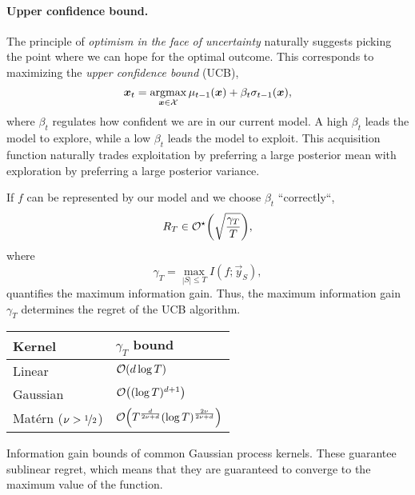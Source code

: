 \paragraph{Upper confidence bound.}

The principle of \textit{optimism in the face of uncertainty} naturally
suggests picking the point where we can hope for the optimal outcome. This
corresponds to maximizing the \textit{upper confidence bound}
(UCB), \[
    \bm{x}_t = \operatorname*{argmax}_{\bm{x}\in\mathcal{X}} \mu_{t-1}(\bm{x}) + \beta_t \sigma_{t-1}(\bm{x}),
\]
where $\beta_t$ regulates how confident we are in our current model. A high
$\beta_t$ leads the model to explore, while a low $\beta_t$ leads the model
to exploit. This acquisition function naturally trades exploitation by
preferring a large posterior mean with exploration by preferring a large
posterior variance.

If $f$ can be represented by our model and we choose $\beta_t$ ``correctly``, \[
    R_T \in \mathcal{O}^\star \lft( \sqrt{\frac{\gamma_T}{T}} \rgt),
\]
where \[
    \gamma_T = \max_{|S|\leq T} I(f;\vec{y}_S),
\]
quantifies the maximum information gain. Thus, the maximum information gain
$\gamma_T$ determines the regret of the UCB algorithm.

\begin{margintable}
    \centering
    \begin{tabular}{ll}
        \toprule
        \textbf{Kernel}                    & \textbf{$\gamma_T$ bound}                                    \\
        \midrule
        Linear                             & $\bigo{d\log T}$                                             \\
        Gaussian                           & $\bigo{(\log T)^{d+1}}$                                      \\
        Mat\'ern ($\nu > \nicefrac{1}{2}$) & $\bigo{T^{\frac{d}{2\nu+d}} (\log T)^{\frac{2\nu}{2\nu+d}}}$ \\
        \bottomrule
    \end{tabular}

    \caption{Information gain bounds of common Gaussian process kernels. These
        guarantee sublinear regret, which means that they are guaranteed to converge
        to the maximum value of the function.}
    \label{tab:information-gain-bounds}
\end{margintable}

